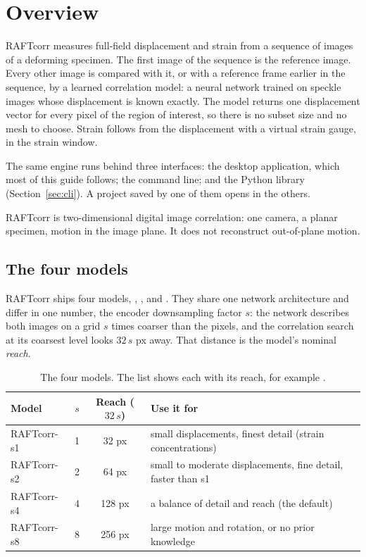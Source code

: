 \section{Overview}
\label{sec:overview}

RAFTcorr measures full-field displacement and strain from a sequence of images of a deforming
specimen. The first image of the sequence is the reference image. Every other image is compared
with it, or with a reference frame earlier in the sequence, by a learned correlation model: a neural network trained
on speckle images whose displacement is known exactly. The model returns one displacement vector
for every pixel of the region of interest, so there is no subset size and no mesh to choose.
Strain follows from the displacement with a virtual strain gauge, in the strain window.

The same engine runs behind three interfaces: the desktop application, which most of this guide
follows; the  command line; and the Python library (Section~\ref{sec:cli}). A
project saved by one of them opens in the others.

\begin{notebox}
RAFTcorr is two-dimensional digital image correlation: one camera, a planar specimen, motion in
the image plane. It does not reconstruct out-of-plane motion.
\end{notebox}

\subsection{The four models}
\label{sec:overview-models}

RAFTcorr ships four models, , ,  and . They share
one network architecture and differ in one number, the encoder downsampling factor $s$: the
network describes both images on a grid $s$ times coarser than the pixels, and the correlation
search at its coarsest level looks $32\,s$ px away. That distance is the model's nominal
\emph{reach}.

\begin{table}[htbp]
  \centering
  \caption{The four models. The  list shows each with its reach, for example
  .}
  \label{tab:models}
  \begin{tabular}{lccl}
    \toprule
    Model & $s$ & Reach ($32\,s$) & Use it for \\
    \midrule
    RAFTcorr-s1 & 1 & 32 px  & small displacements, finest detail (strain concentrations) \\
    RAFTcorr-s2 & 2 & 64 px  & small to moderate displacements, fine detail, faster than s1 \\
    RAFTcorr-s4 & 4 & 128 px & a balance of detail and reach (the default) \\
    RAFTcorr-s8 & 8 & 256 px & large motion and rotation, or no prior knowledge \\
    \bottomrule
  \end{tabular}
\end{table}

